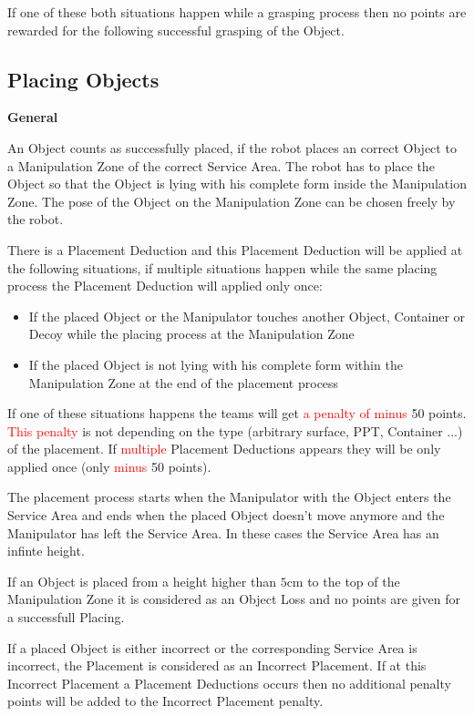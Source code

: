 If one of these both situations happen while a grasping process then no points are rewarded for the following successful grasping of the Object.

\subsection{Placing Objects} \label{ssec:PlacingObjects}

\textbf{General}

An Object counts as successfully placed, if the robot places an correct Object to a Manipulation Zone of the correct Service Area. The robot has to place the Object so that the Object is lying with his complete form inside the Manipulation Zone. The pose of the Object on the Manipulation Zone can be chosen freely by the robot.

There is a Placement Deduction and this Placement Deduction will be applied at the following situations, if multiple situations happen while the same placing process the Placement Deduction will applied only once:

\begin{itemize}
	\item If the placed Object or the Manipulator touches another Object, Container or Decoy while the placing process at the Manipulation Zone 
	\item If the placed Object is not lying with his complete form within the Manipulation Zone at the end of the placement process
\end{itemize}

If one of these situations happens the teams will get \textcolor{red}{a penalty of minus} 50 points. \textcolor{red}{This penalty} is not depending on the type (arbitrary surface, PPT, Container ...) of the placement. If \textcolor{red}{multiple} Placement Deductions appears they will be only applied once (only \textcolor{red}{minus} 50 points).

The placement process starts when the Manipulator with the Object enters the Service Area and ends when the placed Object doesn't move anymore and the Manipulator has left the Service Area. In these cases the Service Area has an infinte height.

If an Object is placed from a height higher than $5\si{\centi\meter}$ to the top of the Manipulation Zone it is considered as an Object Loss and no points are given for a successfull Placing.

If a placed Object is either incorrect or the corresponding Service Area is incorrect, the Placement is considered as an Incorrect Placement. If at this Incorrect Placement a Placement Deductions occurs then no additional penalty points will be added to the Incorrect Placement penalty.

